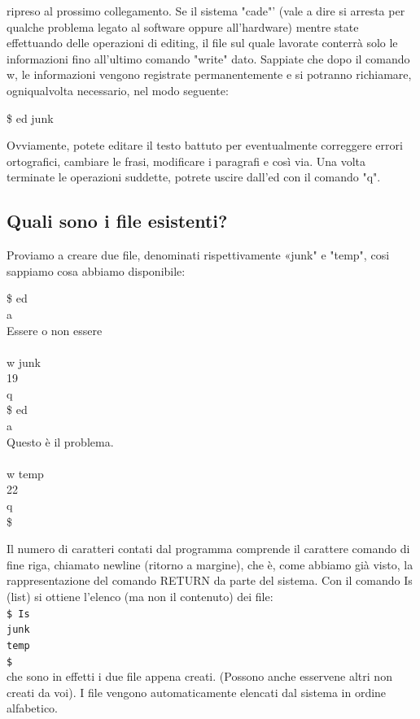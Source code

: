 ripreso al prossimo collegamento. Se il sistema "cade"' (vale a dire si arresta per
qualche problema legato al software oppure all'hardware) mentre state effettuando
delle operazioni di editing, il file sul quale lavorate conterrà solo le informazioni fino
all'ultimo comando "write" dato. Sappiate che dopo il comando w, le informazioni
vengono registrate permanentemente e si potranno richiamare, ogniqualvolta necessario, 
nel modo seguente:
\begin{multicols}{2}
	\$ ed junk
\end{multicols}
Ovviamente, potete editare il testo battuto per eventualmente correggere errori ortografici,
cambiare le frasi, modificare i paragrafi e così via. Una volta terminate le
operazioni suddette, potrete uscire dall'ed con il comando "q".
\subsection{Quali sono i file esistenti?}
Proviamo a creare due file, denominati rispettivamente «junk" e "temp", cosi sappiamo cosa abbiamo disponibile:
\begin{multicols}{1}
	\$ ed\\
	a\\
	Essere o non essere\\\\
	w junk\\
	19\\
	q\\
	\$ ed\\
	a\\
	Questo è il problema.\\\\
	w temp\\
	22\\
	q\\
	\$
\end{multicols}
Il numero di caratteri contati dal programma comprende il carattere comando di fine
riga, chiamato newline (ritorno a margine), che è, come abbiamo già visto, la rappresentazione
 del comando RETURN da parte del sistema.
Con il comando Is (list) si ottiene l'elenco (ma non il contenuto) dei file:\\
{\tt \$ Is}\\
{\tt junk}\\
{\tt temp}\\
{\tt \$}\\
che sono in effetti i due file appena creati. (Possono anche esservene altri non creati
da voi). I file vengono automaticamente elencati dal sistema in ordine alfabetico.
